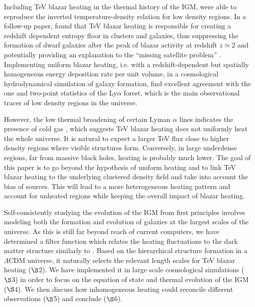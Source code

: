 \documentclass[numberedappendix]{emulateapj}
\begin{document}
Including TeV blazar heating in the thermal history of the IGM, \citet{2012ApJ...752...23C} were able to reproduce the inverted temperature-density relation for low density regions. In a follow-up paper, \citet{2012ApJ...752...24P} found that TeV blazar heating is responsible for creating a redshift dependent entropy floor in clusters and galaxies, thus suppressing the formation of dwarf galaxies after the peak of blazar activity at redshift $z\simeq2$ and potentially providing an explanation to the ``missing satellite problem'' \citep{2010AdAst2010E...8K}. Implementing uniform blazar heating, i.e. with a redshift-dependent but spatially homogeneous energy deposition rate per unit volume, in a cosmological hydrodynamical simulation of galaxy formation, \citet{2012MNRAS.423..149P} find excellent agreement with the one and two-point statistics of the Ly$\alpha$ forest, which is the main observational tracer of low density regions in the universe.

However, the low thermal broadening of certain Lyman $\alpha$ lines indicates the presence of cold gas \citep{2012ApJ...757L..30R}, which suggests TeV blazar heating does not uniformly heat the whole universe. It is natural to expect a larger TeV flux close to higher density regions where visible structures form. Conversely, in large underdense regions, far from massive black holes, heating is probably much lower. The goal of this paper is to go beyond the hypothesis of uniform heating and to link TeV blazar heating to the underlying clustered density field and take into account the bias of sources. This will lead to a more heterogeneous heating pattern and account for unheated regions while keeping the overall impact of blazar heating.

Self-consistently studying the evolution of the IGM from first principles involves modeling both the formation and evolution of galaxies at the largest scales of the universe. As this is still far beyond reach of current computers, we have determined a filter function which relates the heating fluctuations to the dark matter structure similarly to \citet{2007MNRAS.376.1680P,2005ApJ...626....1B,2014PhRvD..89h3010P}. Based on the hierarchical structure formation in a $\Lambda$CDM universe, it naturally selects the relevant length scales for TeV blazar heating ($\S$2). We have implemented it in large scale cosmological simulations ($\S$3) in order to focus on the equation of state and thermal evolution of the IGM ($\S$4). We then discuss how inhomogeneous heating could reconcile different observations ($\S$5) and conclude ($\S$6).
\end{document}
